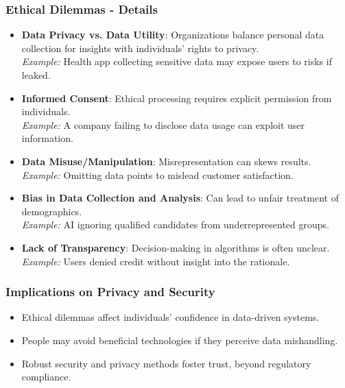 \documentclass{beamer}
\begin{document}
\begin{frame}[fragile]
    \frametitle{Ethical Dilemmas - Details}
    \begin{itemize}
        \item \textbf{Data Privacy vs. Data Utility}: Organizations balance personal data collection for insights with individuals' rights to privacy.\\
        \textit{Example:} Health app collecting sensitive data may expose users to risks if leaked.
        
        \item \textbf{Informed Consent}: Ethical processing requires explicit permission from individuals.\\
        \textit{Example:} A company failing to disclose data usage can exploit user information.
        
        \item \textbf{Data Misuse/Manipulation}: Misrepresentation can skews results.\\
        \textit{Example:} Omitting data points to mislead customer satisfaction.
        
        \item \textbf{Bias in Data Collection and Analysis}: Can lead to unfair treatment of demographics.\\
        \textit{Example:} AI ignoring qualified candidates from underrepresented groups.
        
        \item \textbf{Lack of Transparency}: Decision-making in algorithms is often unclear.\\
        \textit{Example:} Users denied credit without insight into the rationale.
    \end{itemize}
\end{frame}

\begin{frame}[fragile]
    \frametitle{Implications on Privacy and Security}
    \begin{itemize}
        \item Ethical dilemmas affect individuals' confidence in data-driven systems. 
        \item People may avoid beneficial technologies if they perceive data mishandling.
        \item Robust security and privacy methods foster trust, beyond regulatory compliance.
    \end{itemize}
\end{frame}
\end{document}
